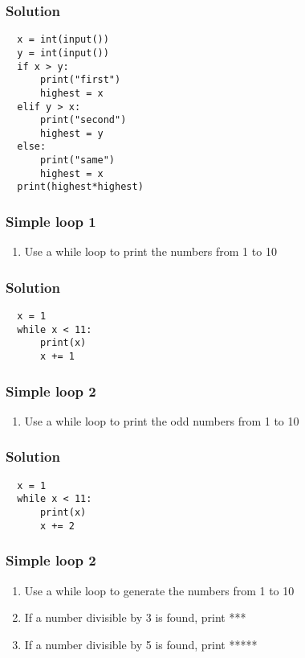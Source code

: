 \documentclass[14pt,compress]{beamer}
\begin{document}
\begin{frame}
\frametitle{Solution}
\begin{lstlisting}
  x = int(input())
  y = int(input())
  if x > y:
      print("first")
      highest = x
  elif y > x:
      print("second")
      highest = y
  else:
      print("same")
      highest = x
  print(highest*highest)
\end{lstlisting}
\end{frame}


\begin{frame}[plain]
  \frametitle{Simple  loop 1}
  \begin{enumerate}
  \item Use a while loop to print the numbers from 1 to 10
  \end{enumerate}
\end{frame}

\begin{frame}
\frametitle{Solution}
\begin{lstlisting}
  x = 1
  while x < 11:
      print(x)
      x += 1
\end{lstlisting}
\end{frame}

\begin{frame}[plain]
  \frametitle{Simple  loop 2}
  \begin{enumerate}
  \item Use a while loop to print the odd numbers from 1 to 10
  \end{enumerate}
\end{frame}

\begin{frame}
\frametitle{Solution}
\begin{lstlisting}
  x = 1
  while x < 11:
      print(x)
      x += 2
\end{lstlisting}
\end{frame}

\begin{frame}[plain]
  \frametitle{Simple  loop 2}
  \begin{enumerate}
  \item Use a while loop to generate the numbers from 1 to 10
  \item If a number divisible by 3 is found, print ***
  \item If a number divisible by 5 is found, print *****
  \end{enumerate}
\end{frame}
\end{document}
